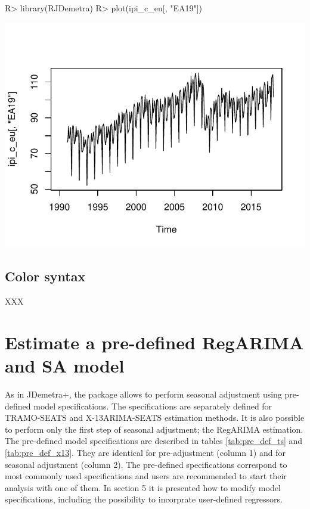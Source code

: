 \documentclass[article]{jss}
\begin{document}
\begin{CodeChunk}

\begin{CodeInput}
R> library(RJDemetra)
R> plot(ipi_c_eu[, "EA19"])
\end{CodeInput}


\begin{center}\includegraphics{img/img-basic_raw_data_plot-1} \end{center}

\end{CodeChunk}

\hypertarget{color-syntax}{%
\subsection{Color syntax}\label{color-syntax}}

XXX

\hypertarget{pre-def-est}{%
\section{Estimate a pre-defined RegARIMA and SA
model}\label{pre-def-est}}

As in JDemetra+, the  package allows to perform seasonal
adjustment using pre-defined model specifications. The specifications
are separately defined for TRAMO-SEATS and X-13ARIMA-SEATS estimation
methods. It is also possible to perform only the first step of seasonal
adjustment; the RegARIMA estimation. The pre-defined model
specifications are described in tables \ref{tab:pre_def_ts} and
\ref{tab:pre_def_x13}. They are identical for pre-adjustment (column 1)
and for seasonal adjustment (column 2). The pre-defined specifications
correspond to most commonly used specifications and users are
recommended to start their analysis with one of them. In section 5 it is
presented how to modify model specifications, including the possibility
to incorprate user-defined regressors.
\end{document}
